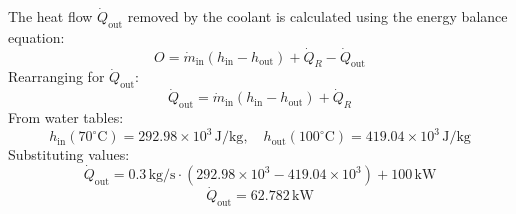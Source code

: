 The heat flow \( \dot{Q}_{\text{out}} \) removed by the coolant is calculated using the energy balance equation:  
\[
O = \dot{m}_{\text{in}} \left( h_{\text{in}} - h_{\text{out}} \right) + \dot{Q}_R - \dot{Q}_{\text{out}}
\]  
Rearranging for \( \dot{Q}_{\text{out}} \):  
\[
\dot{Q}_{\text{out}} = \dot{m}_{\text{in}} \left( h_{\text{in}} - h_{\text{out}} \right) + \dot{Q}_R
\]  
From water tables:  
\[
h_{\text{in}}(70^\circ\text{C}) = 292.98 \times 10^3 \, \text{J/kg}, \quad h_{\text{out}}(100^\circ\text{C}) = 419.04 \times 10^3 \, \text{J/kg}
\]  
Substituting values:  
\[
\dot{Q}_{\text{out}} = 0.3 \, \text{kg/s} \cdot \left( 292.98 \times 10^3 - 419.04 \times 10^3 \right) + 100 \, \text{kW}
\]  
\[
\dot{Q}_{\text{out}} = 62.782 \, \text{kW}
\]